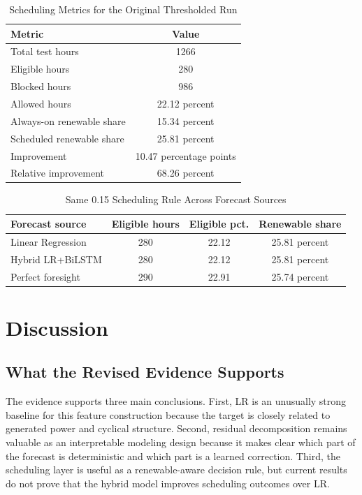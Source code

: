 \documentclass[journal]{IEEEtran}
\begin{document}
\begin{table}[!t]
\caption{Scheduling Metrics for the Original Thresholded Run}
\label{tab:scheduling_metrics}
\centering
\begin{tabular}{lc}
\toprule
Metric & Value \\
\midrule
Total test hours & 1266 \\
Eligible hours & 280 \\
Blocked hours & 986 \\
Allowed hours & 22.12 percent \\
Always-on renewable share & 15.34 percent \\
Scheduled renewable share & 25.81 percent \\
Improvement & 10.47 percentage points \\
Relative improvement & 68.26 percent \\
\bottomrule
\end{tabular}
\end{table}

\begin{table}[!t]
\caption{Same 0.15 Scheduling Rule Across Forecast Sources}
\label{tab:scheduling_comparison}
\centering
\begin{tabular}{lccc}
\toprule
Forecast source & Eligible hours & Eligible pct. & Renewable share \\
\midrule
Linear Regression & 280 & 22.12 & 25.81 percent \\
Hybrid LR+BiLSTM & 280 & 22.12 & 25.81 percent \\
Perfect foresight & 290 & 22.91 & 25.74 percent \\
\bottomrule
\end{tabular}
\end{table}

\section{Discussion}
\subsection{What the Revised Evidence Supports}
The evidence supports three main conclusions. First, LR is an unusually strong baseline for this feature construction because the target is closely related to generated power and cyclical structure. Second, residual decomposition remains valuable as an interpretable modeling design because it makes clear which part of the forecast is deterministic and which part is a learned correction. Third, the scheduling layer is useful as a renewable-aware decision rule, but current results do not prove that the hybrid model improves scheduling outcomes over LR.
\end{document}
